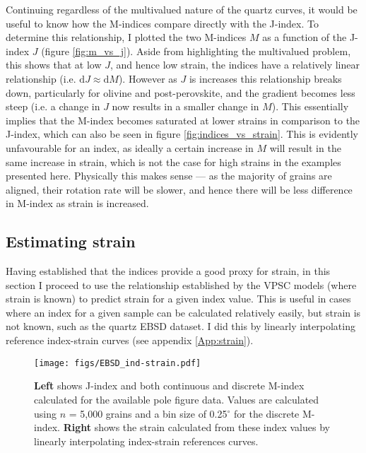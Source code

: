 \documentclass[a4paper,12pt,twoside]{report}
\numberwithin{equation}{chapter}
\begin{document}
Continuing regardless of the multivalued nature of the quartz curves, it would be useful to know how the M-indices compare directly with the J-index. To determine this relationship, I plotted the two M-indices $M$ as a function of the J-index $J$ (figure \ref{fig:m_vs_j}). Aside from highlighting the multivalued problem, this shows that at low $J$, and hence low strain, the indices have a relatively linear relationship (i.e. $\mathrm{d}J \approx \mathrm{d}M$). However as $J$ is increases this relationship breaks down, particularly for olivine and post-perovskite, and the gradient becomes less steep (i.e. a change in $J$ now results in a smaller change in $M$). This essentially implies that the M-index becomes saturated at lower strains in comparison to the J-index, which can also be seen in figure \ref{fig:indices_vs_strain}. This is evidently unfavourable for an index, as ideally a certain increase in $M$ will result in the same increase in strain, which is not the case for high strains in the examples presented here. Physically this makes sense --- as the majority of grains are aligned, their rotation rate will be slower, and hence there will be less difference in M-index as strain is increased.  

\subsection{Estimating strain}

Having established that the indices provide a good proxy for strain, in this section I proceed to use the relationship established by the VPSC models (where strain is known) to predict strain for a given index value. This is useful in cases where an index for a given sample can be calculated relatively easily, but strain is not known, such as the quartz EBSD dataset. I did this by linearly interpolating reference index-strain curves (see appendix \ref{App:strain}).


\begin{figure}[h]
  \centering
    \texttt{[image: figs/EBSD\_ind-strain.pdf]}
  \caption[Relationship of indices to strain (quartz EBSD)]{\textbf{Left} shows J-index and both continuous and discrete M-index calculated for the available pole figure data. Values are calculated using $n$ = 5,000 grains and a bin size of 0.25$^\circ$ for the discrete M-index. \textbf{Right} shows the strain calculated from these index values by linearly interpolating index-strain references curves.} 
  \label{fig:indices_vs_strain_qtz_EBSD}
\end{figure} 
\end{document}
